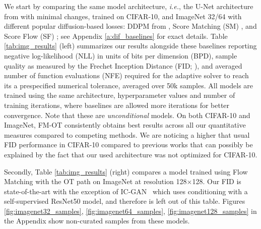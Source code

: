 \documentclass{article}
\makeatletter
\renewcommand*{\ie}{{\it i.e.}\@\xspace}
\makeatother
\begin{document}
{We start by comparing the same model architecture, \ie, the U-Net architecture from \citet{dhariwal2021diffusion} with minimal changes, trained on CIFAR-10, and ImageNet 32/64 with different popular diffusion-based losses: DDPM from \citep{ho2020denoising}, Score Matching (SM) \citep{song2020score}, and Score Flow (SF) \citep{song2021maximum}; see Appendix \ref{a:dif_baselines} for exact details.} Table \ref{tab:img_results} (left)  summarizes our results alongside these baselines reporting negative log-likelihood (NLL) in units of bits per dimension (BPD), sample quality as measured by the Frechet Inception Distance (FID; \citet{heusel2017gans}), and averaged number of function evaluations (NFE) required for the adaptive solver to reach its a prespecified numerical tolerance, averaged over 50k samples. All models are trained using the same architecture, hyperparameter values and number of training iterations, where baselines are allowed more iterations for better convergence. Note that these are \emph{unconditional} models. 
%
{On both CIFAR-10 and ImageNet, FM-OT consistently obtains best results across all our quantitative measures compared to competing methods. We are noticing a higher that usual FID performance in CIFAR-10 compared to previous works \citep{ho2020denoising,song2020score,song2021maximum} that can possibly be explained by the fact that our used architecture was not optimized for CIFAR-10.}

{Secondly, Table \ref{tab:img_results} (right) compares a model trained using Flow Matching with the OT path on ImageNet at resolution 128$\times$128. Our FID is state-of-the-art with the exception of IC-GAN~\citep{casanova2021instance} which uses conditioning with a self-supervised ResNet50 model, and therefore is left out of this table. } Figures \ref{fig:imagenet32_samples}, \ref{fig:imagenet64_samples}, \ref{fig:imagenet128_samples} in the Appendix show non-curated samples from these models. 
\end{document}
